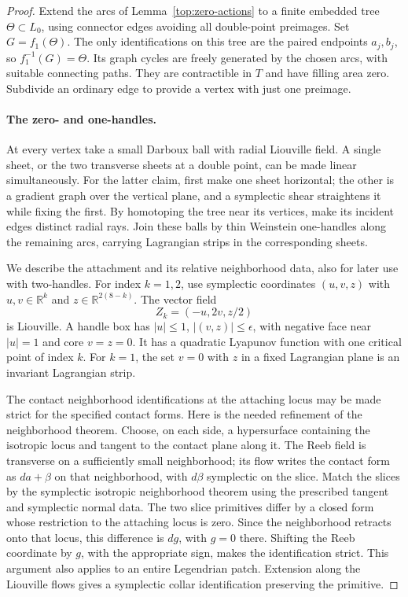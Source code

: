 \documentclass[11pt]{article}
\theoremstyle{definition}
\theoremstyle{remark}
\numberwithin{equation}{section}
\begin{document}
\begin{proof}
Extend the arcs of Lemma~\ref{top:zero-actions} to a finite
embedded tree $\Theta\subset L_0$, using connector edges avoiding
all double-point preimages.  Set $G=f_1(\Theta)$.  The only
identifications on this tree are the paired endpoints $a_j,b_j$,
so $f_1^{-1}(G)=\Theta$.  Its graph cycles are freely generated
by the chosen arcs, with suitable connecting paths.  They are
contractible in $T$ and have filling area zero.  Subdivide an
ordinary edge to provide a vertex with just one preimage.

\paragraph{The zero- and one-handles.}
At every vertex take a small Darboux ball with radial Liouville
field.  A single sheet, or the two transverse sheets at a double
point, can be made linear simultaneously.  For the latter claim,
first make one sheet horizontal; the other is a gradient graph
over the vertical plane, and a symplectic shear straightens it
while fixing the first.  By homotoping the tree near its vertices,
make its incident edges distinct radial rays.  Join these balls by
thin Weinstein one-handles along the remaining arcs, carrying
Lagrangian strips in the corresponding sheets.

We describe the attachment and its relative neighborhood data,
also for later use with two-handles.  For index $k=1,2$, use
symplectic coordinates $(u,v,z)$ with $u,v\in\mathbb R^k$ and
$z\in\mathbb R^{2(8-k)}$.  The vector field
\begin{equation}\label{top:handle-field}
 Z_k=(-u,2v,z/2)
\end{equation}
is Liouville.  A handle box has $|u|\leq1$,
$|(v,z)|\leq\epsilon$, with negative face near $|u|=1$ and
core $v=z=0$.  It has a quadratic Lyapunov function with one
critical point of index $k$.  For $k=1$, the set $v=0$ with $z$
in a fixed Lagrangian plane is an invariant Lagrangian strip.

The contact neighborhood identifications at the attaching locus
may be made strict for the specified contact forms.  Here is the
needed refinement of the neighborhood theorem.  Choose, on each
side, a hypersurface containing the isotropic locus and tangent
to the contact plane along it.  The Reeb field is transverse on
a sufficiently small neighborhood; its flow writes the contact
form as $da+\beta$ on that neighborhood, with $d\beta$
symplectic on the slice.  Match the slices by the symplectic
isotropic neighborhood theorem using the prescribed tangent and
symplectic normal data.  The two slice primitives differ by a
closed form whose restriction to the attaching locus is zero.
Since the neighborhood retracts onto that locus, this difference
is $dg$, with $g=0$ there.  Shifting the Reeb coordinate by $g$,
with the appropriate sign, makes the identification strict.
This argument also applies to an entire Legendrian patch.
Extension along the Liouville flows gives a symplectic collar
identification preserving the primitive.


\end{proof}
\end{document}
